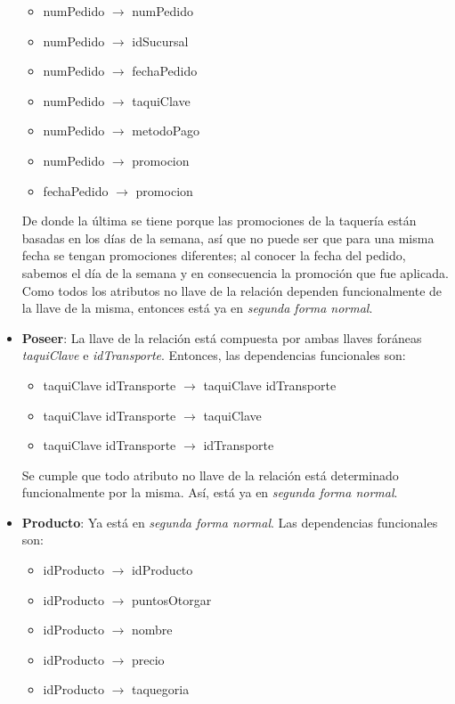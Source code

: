 \documentclass[11pt,letterpaper]{article}
\begin{document}
\begin{itemize}
\begin{itemize}
\item numPedido $\rightarrow$ numPedido

\item numPedido $\rightarrow$ idSucursal
\item numPedido $\rightarrow$ fechaPedido
\item numPedido $\rightarrow$ taquiClave
\item numPedido $\rightarrow$ metodoPago
\item numPedido $\rightarrow$ promocion
\item fechaPedido $\rightarrow$ promocion
\end{itemize}

De donde la última se tiene porque las promociones de la taquería están basadas en los días de la semana, así que no puede ser que para una misma fecha se tengan promociones diferentes; al conocer la fecha del pedido, sabemos el día de la semana y en consecuencia la promoción que fue aplicada.\\

Como todos los atributos no llave de la relación dependen funcionalmente de la llave de la misma, entonces está ya en \textit{segunda forma normal}.
\item \textbf{Poseer}: La llave de la relación está compuesta por ambas llaves foráneas \textit{taquiClave} e \textit{idTransporte}. Entonces, las dependencias funcionales son:

\begin{itemize}
\item taquiClave idTransporte $\rightarrow$ taquiClave idTransporte

\item taquiClave idTransporte $\rightarrow$ taquiClave
\item taquiClave idTransporte $\rightarrow$ idTransporte
\end{itemize}

Se cumple que todo atributo no llave de la relación está determinado funcionalmente por la misma. Así, está ya en \textit{segunda forma normal}.

\item \textbf{Producto}: Ya está en \textit{segunda forma normal}. Las dependencias funcionales son:

\begin{itemize}
\item idProducto $\rightarrow$ idProducto

\item idProducto $\rightarrow$ puntosOtorgar
\item idProducto $\rightarrow$ nombre
\item idProducto $\rightarrow$ precio
\item idProducto $\rightarrow$ taquegoria


\end{itemize}
\end{itemize}
\end{document}
